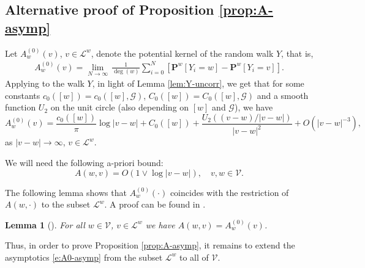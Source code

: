 \documentclass[11pt]{article}
\newtheorem{lemma}[theorem]{Lemma}
\theoremstyle{remark}
\def\Pr{\mathbf{P}}
\def\cG{\mathcal{G}}
\def\cL{\mathcal{L}}
\def\cV{\mathcal{V}}
\newcommand{\eqn}[2]{\begin{equation}\label{#1}#2\end{equation}}
\newcommand{\eqnsplst}[1]{\begin{equation*}\begin{split}%
   #1\end{split}\end{equation*}}
\begin{document}
\subsection{{Alternative proof of Proposition \ref{prop:A-asymp}}}
\label{ssec:Proof-prop:A-asymp}

Let $A^{(0)}_w(v)$, $v \in \cL^w$, denote the potential kernel of the random walk $Y$, that is,
\eqnsplst{
  A^{(0)}_w(v)
  = \lim_{N \to \infty} \, \frac{1}{\deg(w)} \sum_{i=0}^{N} \left[ \Pr^w[ Y_i = w ] 
    - \Pr^w[ Y_i = v ] \right]. }
Applying \cite[Theorem 2]{FU96} to the walk $Y$, in light of Lemma \ref{lem:Y-uncorr}, 
we get that for some constants $c_0([w]) = c_0([w],\cG)$, $C_0([w]) = C_0([w],\cG)$ 
and a smooth function $U_2$ on the unit circle (also depending on $[w]$ and $\cG$), we have 
\eqn{e:A0-asymp}{
  A^{(0)}_w(v)
  = \frac{c_0([w])}{\pi} \log |v - w| + C_0([w]) + \frac{U_2((v - w)/|v - w|)}{|v - w|^2} 
    + O \left( |v - w|^{-3} \right), }
as $| v - w | \to \infty$, $v \in \cL^w$.

We will need the following a-priori bound:
\eqn{e:A-a-priori}
{ A(w,v) 
  = O \left( 1 \vee \log | v - w | \right), \quad v, w \in \cV. }

The following lemma shows that $A^{(0)}_w(\cdot)$ coincides 
with the restriction of $A(w,\cdot)$ to the subset $\cL^w$. 
A proof can be found in \cite[Lemma 21]{HS21}.

\begin{lemma}[{\cite[Lemma 21]{HS21}}] 
For all $w \in \cV$, $v \in \cL^w$ we have $A(w,v) = A^{(0)}_w(v)$.
\end{lemma}

Thus, in order to prove Proposition \ref{prop:A-asymp}, it remains to extend the 
asymptotics \eqref{e:A0-asymp} from the subset $\cL^w$ to all of $\cV$. 
\end{document}
